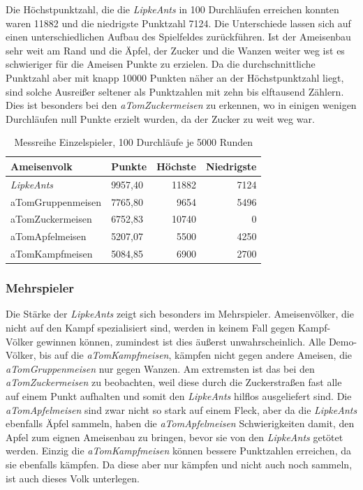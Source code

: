 Die Höchstpunktzahl, die die \textit{LipkeAnts} in 100 Durchläufen erreichen konnten waren 11882 und die niedrigste Punktzahl 7124. Die Unterschiede lassen sich auf einen unterschiedlichen Aufbau des Spielfeldes zurückführen. Ist der Ameisenbau sehr weit am Rand und die Äpfel, der Zucker und die Wanzen weiter weg ist es schwieriger für die Ameisen Punkte zu erzielen. Da die durchschnittliche Punktzahl aber mit knapp 10000 Punkten näher an der Höchstpunktzahl liegt, sind solche Ausreißer seltener als Punktzahlen mit zehn bis elftausend Zählern. Dies ist besonders bei den \textit{aTomZuckermeisen} zu erkennen, wo in einigen wenigen Durchläufen null Punkte erzielt wurden, da der Zucker zu weit weg war.

\begin{table}[hbt]
\centering
\begin{minipage}[t]{.65\textwidth} %
\caption{Messreihe Einzelspieler, 100 Durchläufe je 5000 Runden} %
\begin{tabularx}{\columnwidth}{llrr}
\toprule
Ameisenvolk & Punkte & Höchste & Niedrigste\\
\midrule
\textit{LipkeAnts} & 9957,40 & 11882 & 7124\\
aTomGruppenmeisen & 7765,80 & 9654 & 5496\\
aTomZuckermeisen & 6752,83 & 10740 & 0\\
aTomApfelmeisen & 5207,07 & 5500 & 4250\\
aTomKampfmeisen & 5084,85 & 6900 & 2700\\
\bottomrule
\end{tabularx}
\label{tab:singlePlayer}
\end{minipage}
\end{table}

\subsubsection{Mehrspieler}
Die Stärke der \textit{LipkeAnts} zeigt sich besonders im Mehrspieler. Ameisenvölker, die nicht auf den Kampf spezialisiert sind, werden in keinem Fall gegen Kampf-Völker gewinnen können, zumindest ist dies äußerst unwahrscheinlich. Alle Demo-Völker, bis auf die \textit{aTomKampfmeisen}, kämpfen nicht gegen andere Ameisen, die \textit{aTomGruppenmeisen} nur gegen Wanzen. Am extremsten ist das bei den \textit{aTomZuckermeisen} zu beobachten, weil diese durch die Zuckerstraßen fast alle auf einem Punkt aufhalten und somit den \textit{LipkeAnts} hilflos ausgeliefert sind. Die \textit{aTomApfelmeisen} sind zwar nicht so stark auf einem Fleck, aber da die \textit{LipkeAnts} ebenfalls Äpfel sammeln, haben die \textit{aTomApfelmeisen} Schwierigkeiten damit, den Apfel zum eignen Ameisenbau zu bringen, bevor sie von den \textit{LipkeAnts} getötet werden. Einzig die \textit{aTomKampfmeisen} können bessere Punktzahlen erreichen, da sie ebenfalls kämpfen. Da diese aber nur kämpfen und nicht auch noch sammeln, ist auch dieses Volk unterlegen.

